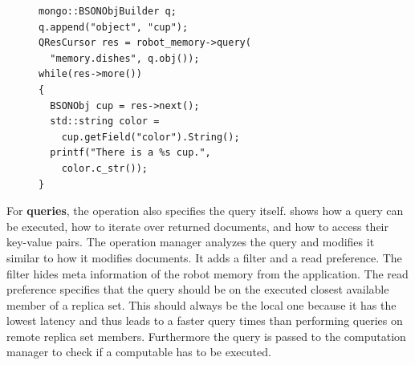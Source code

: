 \begin{figure}
  \vspace{-0.4cm}
\begin{lstlisting}[style=SmallCpp,
  caption={Query for printing all cup colors},
  label=lst:impl-query,
  framexleftmargin=5pt, xleftmargin=0pt,
 morekeywords={}, numbers=none]
mongo::BSONObjBuilder q;
q.append("object", "cup");
QResCursor res = robot_memory->query(
  "memory.dishes", q.obj());
while(res->more())
{
  BSONObj cup = res->next();
  std::string color = 
    cup.getField("color").String();
  printf("There is a %s cup.",
    color.c_str());
}
\end{lstlisting}
\vspace{-8mm}
\end{figure}
For \textbf{queries}, the operation also specifies the query
itself. 
shows how a query can be executed, how to iterate over returned
documents, and how to access their key-value pairs.
The operation manager analyzes the query and modifies it similar
to how it modifies documents. It adds a filter and a read
preference. The filter hides meta information of the robot memory from
the application. The read preference specifies that the query should
be on the executed closest available member of a replica set. This should always be
the local one because it has the lowest latency and thus leads to a
faster query times than performing queries on remote replica set
members. Furthermore the query is passed to the computation manager to
check if a computable has to be executed.

